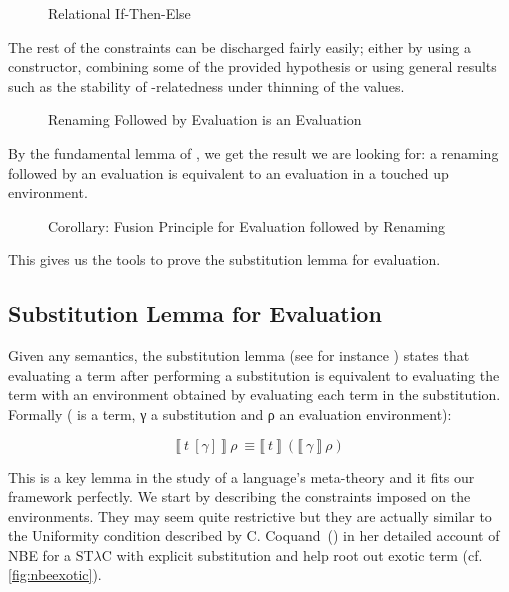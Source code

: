 \begin{figure}[h]
\caption{Relational If-Then-Else}
\end{figure}

The rest of the constraints can be discharged fairly easily; either by using a
constructor, combining some of the provided hypothesis or using general results
such as the stability of -relatedness under thinning of the 
values.

\begin{figure}[h]
\caption{Renaming Followed by Evaluation is an Evaluation}
\end{figure}


By the fundamental lemma of , we get the result we are looking for:
a renaming followed by an evaluation is equivalent to an evaluation in a touched
up environment.

\begin{figure}[h]
\caption{Corollary: Fusion Principle for Evaluation followed by Renaming}
\end{figure}

This gives us the tools to prove the substitution lemma for evaluation.

\subsection{Substitution Lemma for Evaluation}

Given any semantics, the substitution lemma (see for instance \cite{mitchell1991kripke})
states that evaluating a term after performing a substitution is equivalent to evaluating
the term with an environment obtained by evaluating each term in the substitution.
Formally ( is a term, γ a substitution and ρ an evaluation environment):

\[
⟦~t~[γ]~⟧~ρ~≡ ⟦~t~⟧~(⟦~γ~⟧~ρ)
\]

This is a key lemma in the study of a language's meta-theory and it fits our 
framework perfectly. We start by describing the constraints imposed on the environments.
They may seem quite restrictive but they are actually similar to the Uniformity condition
described by C. Coquand~(\citeyear{coquand2002formalised}) in her detailed account of NBE
for a ST$λ$C with explicit substitution and help root out exotic term
(cf. \cref{fig:nbeexotic}).

